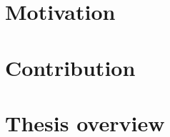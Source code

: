 
\section{Motivation}
\label{ch:intro/motiv}


%

\section{Contribution}
\label{ch:intro/contri}


\newpage

\section{Thesis overview}
\label{ch:intro/overview}

